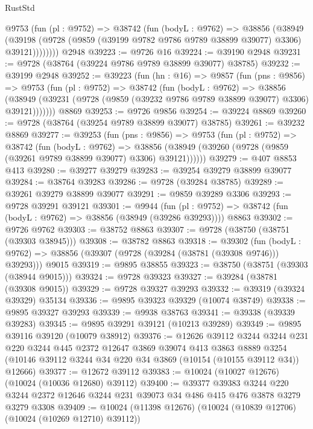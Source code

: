\begin{lexlean}{RustStd}
\begin{coremodule}
        @9753
          (fun (pl : @9752) =>
          @38742
            (fun (bodyL : @9762) =>
            @38856
              (@38949
                (@39198 (@9728 (@9859 (@39199 @9782 @9786 @9789 @38899 @39077) @3306) @39121))))))))
    @2948
@39223 := @9726 @16
@39224 := @39190 @2948
@39231 := @9728 (@38764 (@39224 @9786 @9789 @38899 @39077) @38785)
@39232 := @39199 @2948
@39252 := @39223
    (fun (hn : @16) =>
    @9857
      (fun (pns : @9856) =>
      @9753
        (fun (pl : @9752) =>
        @38742
          (fun (bodyL : @9762) =>
          @38856
            (@38949 (@39231 (@9728 (@9859 (@39232 @9786 @9789 @38899 @39077) @3306) @39121)))))))
    @8869
@39253 := @9726 @9856
@39254 := @39224 @8869
@39260 := @9728 (@38764 (@39254 @9789 @38899 @39077) @38785)
@39261 := @39232 @8869
@39277 := @39253
    (fun (pns : @9856) =>
    @9753
      (fun (pl : @9752) =>
      @38742
        (fun (bodyL : @9762) =>
        @38856 (@38949 (@39260 (@9728 (@9859 (@39261 @9789 @38899 @39077) @3306) @39121))))))
@39279 := @407 @8853 @413
@39280 := @39277 @39279
@39283 := @39254 @39279 @38899 @39077
@39284 := @38764 @39283
@39286 := @9728 (@39284 @38785)
@39289 := @39261 @39279 @38899 @39077
@39291 := @9859 @39289 @3306
@39293 := @9728 @39291 @39121
@39301 := @9944
    (fun (pl : @9752) => @38742 (fun (bodyL : @9762) => @38856 (@38949 (@39286 @39293))))
    @8863
@39302 := @9726 @9762
@39303 := @38752 @8863
@39307 := @9728 (@38750 (@38751 (@39303 @38945)))
@39308 := @38782 @8863
@39318 := @39302
    (fun (bodyL : @9762) => @38856 (@39307 (@9728 (@39284 (@38781 (@39308 @9746))) @39293)))
    @9015
@39319 := @9895 @38855
@39323 := @38750 (@38751 (@39303 (@38944 @9015)))
@39324 := @9728 @39323
@39327 := @39284 (@38781 (@39308 @9015))
@39329 := @9728 @39327 @39293
@39332 := @39319 (@39324 @39329) @35134
@39336 := @9895 @39323 @39329 (@10074 @38749)
@39338 := @9895 @39327 @39293
@39339 := @9938 @38763
@39341 := @39338 (@39339 @39283)
@39345 := @9895 @39291 @39121 (@10213 @39289)
@39349 := @9895 @39116 @39120 (@10079 @38912)
@39376 := @12626
    @39112
    @3244
    @3244
    @231
    @220
    @3244
    @445
    @2372
    @12647
    @3869
    @39074
    @413
    @3863
    @8889
    @3254
    (@10146 @39112 @3244 @34 @220 @34 @3869 (@10154 (@10155 @39112 @34)) @12666)
@39377 := @12672 @39112
@39383 := @10024 (@10027 @12676) (@10024 (@10036 @12680) @39112)
@39400 := @39377
    @39383
    @3244
    @220
    @3244
    @2372
    @12646
    @3244
    @231
    @39073
    @34
    @486
    @415
    @476
    @3878
    @3279
    @3279
    @3308
@39409 := @10024 (@11398 @12676) (@10024 (@10839 @12706) (@10024 (@10269 @12710) @39112))

\end{coremodule}
\end{lexlean}
